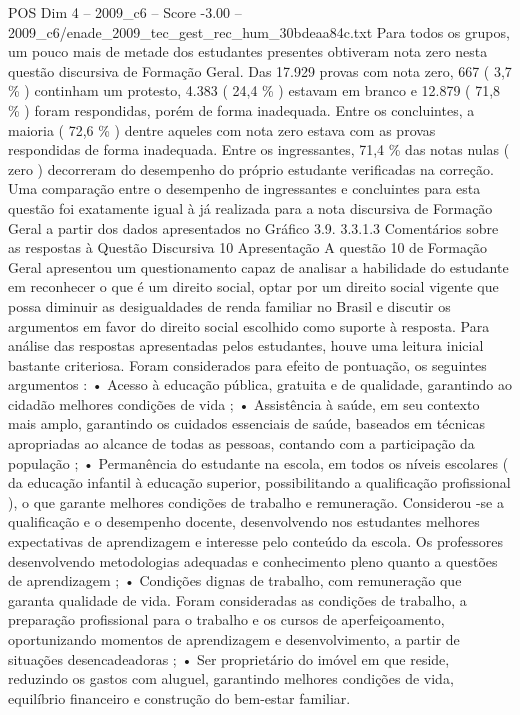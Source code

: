 \begin{textsample}{POS Dim 4 – 2009\_c6 – Score -3.00 – 2009\_c6/enade\_2009\_tec\_gest\_rec\_hum\_30bdeaa84c.txt}
Para todos os grupos, um pouco mais de metade dos estudantes presentes obtiveram nota zero nesta questão discursiva de Formação Geral.
Das 17.929 provas com nota zero, 667 ( 3,7 \% ) continham um protesto, 4.383 ( 24,4 \% ) estavam em branco e 12.879 ( 71,8 \% ) foram respondidas, porém de forma inadequada.
Entre os concluintes, a maioria ( 72,6 \% ) dentre aqueles com nota zero estava com as provas respondidas de forma inadequada.
Entre os ingressantes, 71,4 \% das notas nulas ( zero ) decorreram do desempenho do próprio estudante verificadas na correção.
Uma comparação entre o desempenho de ingressantes e concluintes para esta questão foi exatamente igual à já realizada para a nota discursiva de Formação Geral a partir dos dados apresentados no Gráfico 3.9. 3.3.1.3 Comentários sobre as respostas à Questão Discursiva 10 Apresentação A questão 10 de Formação Geral apresentou um questionamento capaz de analisar a habilidade do estudante em reconhecer o que é um direito social, optar por um direito social vigente que possa diminuir as desigualdades de renda familiar no Brasil e discutir os argumentos em favor do direito social escolhido como suporte à resposta.
Para análise das respostas apresentadas pelos estudantes, houve uma leitura inicial bastante criteriosa.
Foram considerados para efeito de pontuação, os seguintes argumentos : • Acesso à educação pública, gratuita e de qualidade, garantindo ao cidadão melhores condições de vida ; • Assistência à saúde, em seu contexto mais amplo, garantindo os cuidados essenciais de saúde, baseados em técnicas apropriadas ao alcance de todas as pessoas, contando com a participação da população ; • Permanência do estudante na escola, em todos os níveis escolares ( da educação infantil à educação superior, possibilitando a qualificação profissional ), o que garante melhores condições de trabalho e remuneração.
Considerou -se a qualificação e o desempenho docente, desenvolvendo nos estudantes melhores expectativas de aprendizagem e interesse pelo conteúdo da escola.
Os professores desenvolvendo metodologias adequadas e conhecimento pleno quanto a questões de aprendizagem ; • Condições dignas de trabalho, com remuneração que garanta qualidade de vida.
Foram consideradas as condições de trabalho, a preparação profissional para o trabalho e os cursos de aperfeiçoamento, oportunizando momentos de aprendizagem e desenvolvimento, a partir de situações desencadeadoras ; • Ser proprietário do imóvel em que reside, reduzindo os gastos com aluguel, garantindo melhores condições de vida, equilíbrio financeiro e construção do bem-estar familiar.

\end{textsample}
